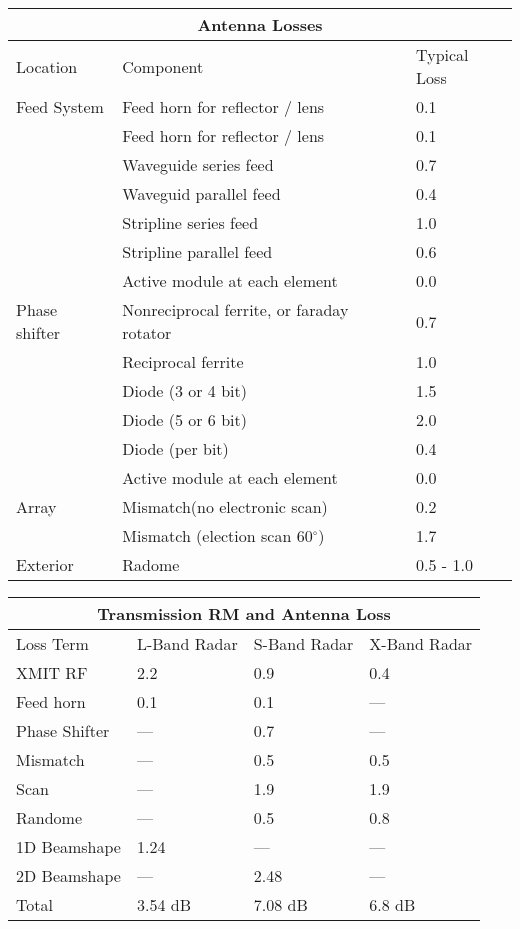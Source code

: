 \documentclass[12pt]{article}
\begin{document}
\begin{center}
    \begin{tabular}{ |p{5cm}|p{8cm}|p{3cm}| }
        \hline
            \multicolumn{3}{|c|}{Antenna Losses} \\
        \hline
            Location & Component & Typical Loss \\
        \hline
            Feed System & Feed horn for reflector / lens & 0.1 \\
             & Feed horn for reflector / lens & 0.1 \\
             & Waveguide series feed & 0.7 \\
             & Waveguid parallel feed & 0.4 \\
             & Stripline series feed & 1.0 \\
             & Stripline parallel feed & 0.6 \\
             & Active module at each element & 0.0 \\

            Phase shifter & Nonreciprocal ferrite, or faraday rotator & 0.7 \\
             & Reciprocal ferrite & 1.0 \\
             & Diode (3 or 4 bit) & 1.5 \\
             & Diode (5 or 6 bit) & 2.0 \\
             & Diode (per bit) & 0.4 \\
             & Active module at each element & 0.0 \\
            Array & Mismatch(no electronic scan) & 0.2 \\
             & Mismatch (election scan 60$^{\circ}$) & 1.7 \\
            Exterior & Radome & 0.5 - 1.0 \\
        \hline
    \end{tabular}
\end{center}

\begin{center}
    \begin{tabular}{ |p{4cm}|p{3cm}|p{3cm}|p{3cm}|}
        \hline
            \multicolumn{4}{|c|}{Transmission RM and Antenna Loss} \\
        \hline
            Loss Term & L-Band Radar & S-Band Radar & X-Band Radar \\
        \hline
            XMIT RF & 2.2 & 0.9 & 0.4 \\
            Feed horn & 0.1 & 0.1 & --- \\
            Phase Shifter & --- & 0.7 & --- \\
            Mismatch & --- & 0.5 & 0.5\\
            Scan & --- & 1.9 & 1.9\\
            Randome & --- &  0.5 & 0.8\\
            1D Beamshape & 1.24 & --- & --- \\
            2D Beamshape & --- & 2.48 & --- \\
            Total & 3.54 dB & 7.08 dB & 6.8 dB\\
        \hline
    \end{tabular}
\end{center}
\end{document}

